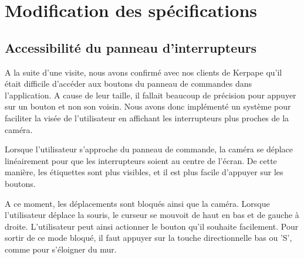 \section{Modification des spécifications}
\subsection{Accessibilité du panneau d'interrupteurs}
A la suite d'une visite, nous avons confirmé avec nos clients de Kerpape qu'il était difficile d'accéder aux boutons du panneau de commandes dans l'application. A cause de leur taille, il fallait beaucoup de précision pour appuyer sur un bouton et non son voisin. Nous avons donc implémenté un système pour faciliter la visée de l'utilisateur en affichant les interrupteurs plus proches de la caméra.\newline

Lorsque l'utilisateur s'approche du panneau de commande, la caméra se déplace linéairement pour que les interrupteurs soient au centre de l'écran. De cette manière, les étiquettes sont plus visibles, et il est plus facile d'appuyer sur les boutons.\newline

A ce moment, les déplacements sont bloqués ainsi que la caméra. Lorsque l'utilisateur déplace la souris, le curseur se mouvoit de haut en bas et de gauche à droite. L'utilisateur peut ainsi actionner le bouton qu'il souhaite facilement. Pour sortir de ce mode bloqué, il faut appuyer sur la touche directionnelle bas ou 'S', comme pour s'éloigner du mur.

